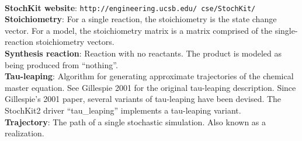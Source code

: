 \documentclass[11pt,letterpaper]{article}
\newcommand\backmatter{%
    \clearpage %
  }
\begin{document}
    \\\textbf{StochKit website}: \texttt{http://engineering.ucsb.edu/~cse/StochKit/}
    \\\textbf{Stoichiometry}: For a single reaction, the stoichiometry is the state change vector.  For a model, the stoichiometry matrix is a matrix comprised of the single-reaction stoichiometry vectors.
    \\\textbf{Synthesis reaction}: Reaction with no reactants.  The product is modeled as being produced from “nothing”.
    \\\textbf{Tau-leaping}: Algorithm for generating approximate trajectories of the chemical master equation.  See Gillespie 2001 for the original tau-leaping description.  Since Gillespie's 2001 paper, several variants of tau-leaping have been devised.  The StochKit2 driver “tau\_leaping” implements a tau-leaping variant.
    \\\textbf{Trajectory}: The path of a single stochastic simulation.  Also known as a realization.








\backmatter
{\singlespace

%
}
\end{document}
